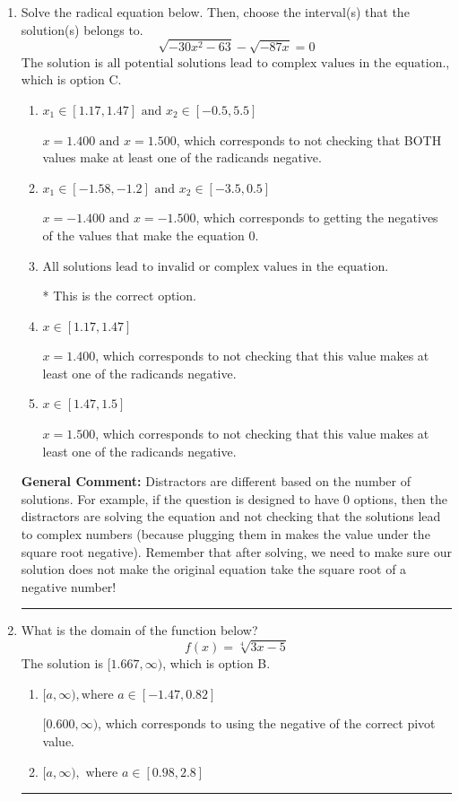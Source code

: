 \documentclass{extbook}[14pt]
\newcommand{\litem}[1]{\item #1

\rule{\textwidth}{0.4pt}}
\begin{document}
\begin{enumerate}\litem{
Solve the radical equation below. Then, choose the interval(s) that the solution(s) belongs to.
\[ \sqrt{-30 x^2 - 63} - \sqrt{-87 x} = 0 \]The solution is \( \text{all potential solutions lead to complex values in the equation.} \), which is option C.\begin{enumerate}[label=\Alph*.]
\item \( x_1 \in [1.17, 1.47] \text{ and } x_2 \in [-0.5,5.5] \)

$x = 1.400 \text{ and } x = 1.500$, which corresponds to not checking that BOTH values make at least one of the radicands negative.
\item \( x_1 \in [-1.58, -1.2] \text{ and } x_2 \in [-3.5,0.5] \)

$x = -1.400 \text{ and } x = -1.500$, which corresponds to getting the negatives of the values that make the equation 0.
\item \( \text{All solutions lead to invalid or complex values in the equation.} \)

* This is the correct option.
\item \( x \in [1.17,1.47] \)

$x = 1.400$, which corresponds to not checking that this value makes at least one of the radicands negative.
\item \( x \in [1.47,1.5] \)

$x = 1.500$, which corresponds to not checking that this value makes at least one of the radicands negative.
\end{enumerate}

\textbf{General Comment:} Distractors are different based on the number of solutions. For example, if the question is designed to have 0 options, then the distractors are solving the equation and not checking that the solutions lead to complex numbers (because plugging them in makes the value under the square root negative). Remember that after solving, we need to make sure our solution does not make the original equation take the square root of a negative number!
}
\litem{
What is the domain of the function below?
\[ f(x) = \sqrt[4]{3 x - 5} \]The solution is \( [1.667, \infty) \), which is option B.\begin{enumerate}[label=\Alph*.]
\item \( [a, \infty), \text{where } a \in [-1.47, 0.82] \)

$[0.600, \infty)$, which corresponds to using the negative of the correct pivot value.
\item \( [a, \infty), \text{ where } a \in [0.98, 2.8] \)


\end{enumerate}}
\end{enumerate}
\end{document}
